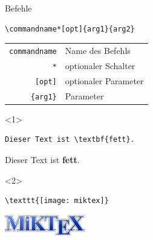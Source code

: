 \begin{Frame}[fragile, t]{Befehle}
  \xxx

  \begin{Definition}[Befehl]
    \begin{lstlisting}[gobble=6,style=block,morekeywords={commandname,commandname*}]
      \commandname*[opt]{arg1}{arg2}
    \end{lstlisting}

    \begin{tabular}{rl}
      \lstinline[morekeywords={commandname}]-commandname- & Name des Befehls \\
      \lstinline-*- & optionaler Schalter \\
      \lstinline-[opt]- & optionaler Parameter \\
      \lstinline-{arg1}- & Parameter
    \end{tabular}
  \end{Definition}

  \xxx

  \begin{onlyenv}<1>
    \begin{Beispiel}[Befehl]
      \begin{lstlisting}[gobble=8,style=block]
        Dieser Text ist \textbf{fett}.
      \end{lstlisting}
      Dieser Text ist \textbf{fett}.
    \end{Beispiel}
  \end{onlyenv}

  \begin{onlyenv}<2>
    \begin{Beispiel}
      \begin{lstlisting}[gobble=8,style=block]
        \texttt{[image: miktex]}
      \end{lstlisting}
      \includegraphics[width=3.5cm]{images/miktex}
    \end{Beispiel}
  \end{onlyenv}
\end{Frame}

